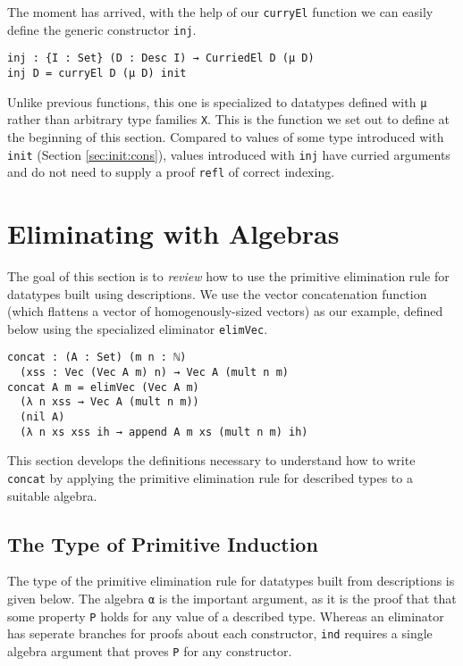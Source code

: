 \documentclass[preprint,nonatbib]{sigplanconf}
\newcommand{\refsec}[1]{Section \ref{sec:#1}}
\begin{document}
The moment has arrived, with the help of our {\tt curryEl} function we
can easily define the generic constructor {\tt inj}.

\begin{verbatim}
inj : {I : Set} (D : Desc I) → CurriedEl D (μ D)
inj D = curryEl D (μ D) init
\end{verbatim}

Unlike previous functions, this one is specialized to datatypes
defined with {\tt μ} rather than arbitrary type families {\tt X}. This
is the function we set out to define at the beginning of this section.
Compared to values of some type introduced with {\tt init} (\refsec{init:cons}),
values introduced with {\tt inj} have curried arguments and do not
need to supply a proof {\tt refl} of correct indexing.

\section{Eliminating with Algebras}
\label{sec:ind}

The goal of this section is to {\it review} how to use the primitive
elimination rule for datatypes built using descriptions. We use
the vector concatenation function (which flattens a vector of
homogenously-sized vectors) as our example, defined below using the
specialized eliminator {\tt elimVec}.

\begin{verbatim}
concat : (A : Set) (m n : ℕ)
  (xss : Vec (Vec A m) n) → Vec A (mult n m)
concat A m = elimVec (Vec A m)
  (λ n xss → Vec A (mult n m))
  (nil A)
  (λ n xs xss ih → append A m xs (mult n m) ih)
\end{verbatim}

This section develops the definitions necessary to understand how to
write {\tt concat} by applying the primitive elimination rule for
described types to a suitable algebra.

\subsection{The Type of Primitive Induction}

The type of the primitive elimination rule for datatypes built from
descriptions is given below.
The algebra {\tt α} is the important argument, as it is the proof that
that some property {\tt P} holds for any value of a
described type.
Whereas an eliminator
has seperate branches for proofs about each constructor, {\tt ind}
requires a single algebra argument that proves {\tt P} for any
constructor.
\end{document}
